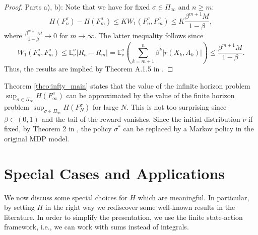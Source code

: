 \documentclass[reqno, 12pt]{amsart}%
\newcommand{\EE}{\mathbb{E}}
\theoremstyle{definition}
\numberwithin{equation}{section} \numberwithin{theorem}{section}
\begin{document}
\begin{proof}
Parts a), b): Note that we have for fixed 
$\sigma\in \Pi_\infty$ and $n\ge m:$
$$ H(F_n^\sigma) - H(F_m^\sigma)\le K 
W_1(F_n^\sigma, F_m^\sigma) \le K 
\frac{\beta^{m+1} M }{1-\beta},$$
where  $\frac{\beta^{m+1} M}{1-\beta} \to 0$ for $m\to\infty.$
The latter inequality follows since
$$ W_1(F_n^\sigma, F_m^\sigma) \le \EE^\sigma_\nu |R_n-R_m| =  \EE^\sigma_\nu
\left(\sum_{k=m+1}^n \beta^k |r(X_k,A_k)|\right)\le \frac{\beta^{m+1} M}{1-\beta}.$$
Thus, the results are implied by 
Theorem A.1.5 in \cite{br11}. 
\end{proof}

 Theorem \ref{theo:infty_main} states that the value of the infinite horizon problem $\sup_{\sigma\in \Pi_\infty} H(F_\infty^\sigma)$ can be approximated by the value of the finite horizon problem $\sup_{\sigma\in \Pi_\infty} H(F_N^\sigma)$ for large $N$. This is not too surprising since $\beta\in (0,1)$ and the tail of the reward vanishes. Since the initial distribution $\nu$ if fixed, by  Theorem 2 in \cite{derman1966note}, the policy $\sigma^*$ can be replaced by a Markov policy in the original MDP model. %



\section{Special Cases and Applications}\label{sec:specialcases}
We now discuss some special choices for $H$ which are meaningful. In particular, by setting $H$ in the right way we rediscover some well-known results in the literature. In order to simplify the presentation, we use the finite state-action framework, i.e., we can work with sums instead of integrals.
\end{document}
